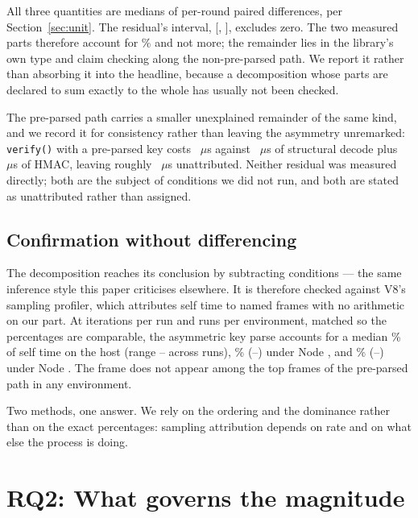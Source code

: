 \documentclass[pdflatex,sn-basic,twocolumn]{sn-jnl}%
\begin{document}
All three quantities are medians of per-round paired differences, per
Section~\ref{sec:unit}. The residual's interval,
[\DecompResidualCiLo, \DecompResidualCiHi], excludes zero. The two measured
parts therefore account for \DecompExplainedPct\% and not more; the remainder
lies in the library's own type and claim checking along the non-pre-parsed path.
We report it rather than absorbing it into the headline, because a decomposition
whose parts are declared to sum exactly to the whole has usually not been
checked.

The pre-parsed path carries a smaller unexplained remainder of the same kind, and
we record it for consistency rather than leaving the asymmetry unremarked:
\texttt{verify()} with a pre-parsed key costs \HostJwtPreparsed~$\mu$s against
\HostDecodeOnly~$\mu$s of structural decode plus \HostHmacKeyObject~$\mu$s of
HMAC, leaving roughly \PreparsedUnattributed~$\mu$s unattributed. Neither
residual was measured directly; both are the subject of conditions we did not
run, and both are stated as unattributed rather than assigned.

\subsection{Confirmation without differencing}

The decomposition reaches its conclusion by subtracting conditions --- the same
inference style this paper criticises elsewhere. It is therefore checked against
V8's sampling profiler, which attributes self time to named frames with no
arithmetic on our part. At \ProfIterations{} iterations per run and
\ProfRepeats{} runs per environment, matched so the percentages are comparable,
the asymmetric key parse accounts for a median \ProfHostPct\% of self time on
the host (range \ProfHostPctLo--\ProfHostPctHi{} across runs),
\ProfEighteenPct\% (\ProfEighteenPctLo--\ProfEighteenPctHi) under Node
\NodeEighteenNodeMajor, and \ProfTwentySixPct\%
(\ProfTwentySixPctLo--\ProfTwentySixPctHi) under Node
\NodeTwentySixMuslNodeMajor. The frame does not appear among the top frames of
the pre-parsed path in any environment.

Two methods, one answer. We rely on the ordering and the dominance rather than on
the exact percentages: sampling attribution depends on rate and on what else the
process is doing.

\section{RQ2: What governs the magnitude}\label{sec:rq2}
\end{document}
